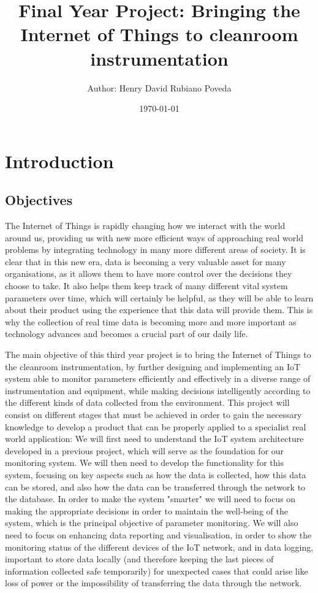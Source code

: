 \documentclass{article}
\title{Final Year Project: Bringing the Internet of Things to cleanroom instrumentation}
\author{Author: Henry David Rubiano Poveda}
\date{\today}
\begin{document}
\maketitle
\newpage

\tableofcontents
\newpage

\section{Introduction}
\subsection{Objectives}

The Internet of Things is rapidly changing how we interact with the world around us, providing us with new more efficient ways of approaching real world problems by integrating technology in many more different areas of society. It is clear that in this new era, data is becoming a very valuable asset for many organisations, as it allows them to have more control over the decisions they choose to take. It also helps them keep track of many different vital system parameters over time, which will certainly be helpful, as they will be able to learn about their product using the experience that this data will provide them. This is why the collection of real time data is becoming more and more important as technology advances and becomes a crucial part of our daily life.\newline 

The main objective of this third year project is to bring the Internet of Things to the cleanroom instrumentation, by further designing and implementing an IoT system able to monitor parameters efficiently and effectively in a diverse range of instrumentation and equipment, while making decisions intelligently according to the different kinds of data collected from the environment. This project will consist on different stages that must be achieved in order to gain the necessary knowledge to develop a product that can be properly applied to a specialist real world application: We will first need to understand the IoT system architecture developed in a previous project, which will serve as the foundation for our monitoring system. We will then need to develop the functionality for this system, focusing on key aspects such as how the data is collected, how this data can be stored, and also how the data can be transferred through the network to the database. In order to make the system "smarter" we will need to focus on making the appropriate decisions in order to maintain the well-being of the system, which is the principal objective of parameter monitoring. We will also need to focus on enhancing data reporting and visualisation, in order to show the monitoring status of the different devices of the IoT network, and in data logging, important to store data locally (and therefore keeping the last pieces of information collected safe temporarily) for unexpected cases that could arise like loss of power or the impossibility of transferring the data through the network. 
\end{document}
